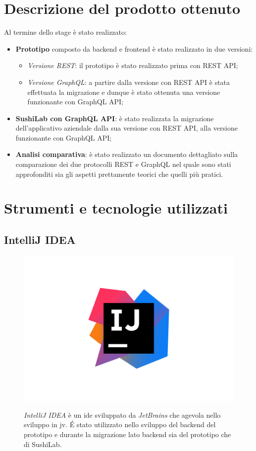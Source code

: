 \section{Descrizione del prodotto ottenuto}
Al termine dello stage è stato realizzato:
\begin{itemize}
  \item \textbf{Prototipo} composto da backend e frontend è stato realizzato in due versioni:
  \begin{itemize}
    \item \textit{Versione REST}: il prototipo è stato realizzato prima con REST API;
    \item \textit{Versione GraphQL}: a partire dalla versione con REST API è stata effettuata la migrazione e dunque è stato ottenuta una versione funzionante con GraphQL API;
  \end{itemize}
  \item \textbf{SushiLab con GraphQL API}: è stato realizzata la migrazione dell'applicativo aziendale dalla sua versione con REST API, alla versione funzionante con GraphQL API;
  \item \textbf{Analisi comparativa}: è stato realizzato un documento dettagliato sulla comparazione dei due protocolli REST e GraphQL nel quale sono stati approfonditi sia gli aspetti prettamente teorici che quelli più pratici.
\end{itemize}
\newpage
\section{Strumenti e tecnologie utilizzati}
\subsection*{IntelliJ IDEA}
\begin{figure}[ht]
  \begin{minipage}[h]{0.3\linewidth}
    \centering
    \includegraphics[width=0.9\linewidth]{immagini/IntelliJ.png}
  \end{minipage}
  \begin{minipage}[!h]{0.7\linewidth}
    \textit{IntelliJ IDEA} è un \gls{ide} sviluppato da \textit{JetBrains} che agevola nello sviluppo in \gls{jv}.
    É stato utilizzato nello sviluppo del backend del prototipo e durante la migrazione lato backend sia del prototipo che di SushiLab.
  \end{minipage}
\end{figure}
